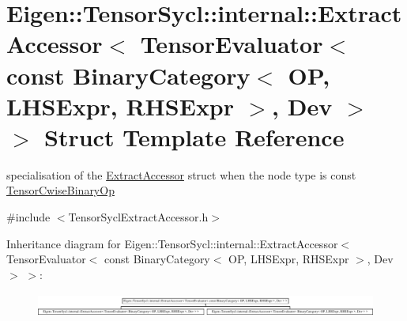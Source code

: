 \hypertarget{struct_eigen_1_1_tensor_sycl_1_1internal_1_1_extract_accessor_3_01_tensor_evaluator_3_01const_01b2d1164787704459976e801609bbec58}{}\section{Eigen\+:\+:Tensor\+Sycl\+:\+:internal\+:\+:Extract\+Accessor$<$ Tensor\+Evaluator$<$ const Binary\+Category$<$ OP, L\+H\+S\+Expr, R\+H\+S\+Expr $>$, Dev $>$ $>$ Struct Template Reference}
\label{struct_eigen_1_1_tensor_sycl_1_1internal_1_1_extract_accessor_3_01_tensor_evaluator_3_01const_01b2d1164787704459976e801609bbec58}


specialisation of the \hyperlink{struct_eigen_1_1_tensor_sycl_1_1internal_1_1_extract_accessor}{Extract\+Accessor} struct when the node type is const \hyperlink{class_eigen_1_1_tensor_cwise_binary_op}{Tensor\+Cwise\+Binary\+Op}  




{\ttfamily \#include $<$Tensor\+Sycl\+Extract\+Accessor.\+h$>$}

Inheritance diagram for Eigen\+:\+:Tensor\+Sycl\+:\+:internal\+:\+:Extract\+Accessor$<$ Tensor\+Evaluator$<$ const Binary\+Category$<$ OP, L\+H\+S\+Expr, R\+H\+S\+Expr $>$, Dev $>$ $>$\+:\begin{figure}[H]
\begin{center}
\leavevmode
\includegraphics[height=0.770289cm]{struct_eigen_1_1_tensor_sycl_1_1internal_1_1_extract_accessor_3_01_tensor_evaluator_3_01const_01b2d1164787704459976e801609bbec58}
\end{center}
\end{figure}
